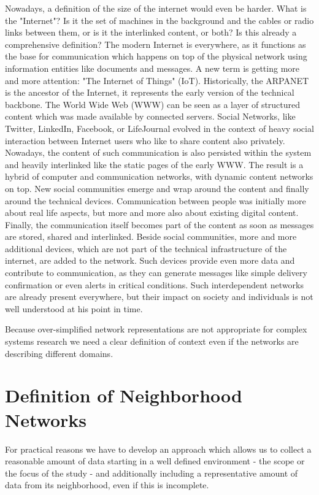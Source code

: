 \documentclass[a4paper,10pt]{scrbook}
\begin{document}
Nowadays, a definition of the size of the internet would even be harder. What is the "Internet"? Is it the set of machines in the background and the cables or radio links between them, or is it the interlinked content, or both? Is this already a comprehensive definition? The modern Internet is everywhere, as it functions as the base for communication which happens on top of the physical network using information entities like documents and messages. A new term is getting more and more attention: "The Internet of Things" (IoT). Historically, the ARPANET is the ancestor of the Internet, it represents the early version of the technical backbone. The World Wide Web (WWW) can be seen as a layer of structured content which was made available by connected servers. Social Networks, like Twitter, LinkedIn, Facebook, or LifeJournal evolved in the context of heavy social interaction between Internet users who like to share content also privately. Nowadays, the content of such communication is also persisted within the system and heavily interlinked like the static pages of the early WWW. The result is a hybrid of computer and communication networks, with dynamic content networks on top. New social communities emerge and wrap around the content and finally around the technical devices. Communication between people was initially more about real life aspects, but more and more also about existing digital content. Finally, the communication itself becomes part of the content as soon as messages are stored, shared and interlinked. Beside social communities, more and more additional devices, which are not part of the technical infrastructure of the internet, are added to the network. Such devices provide even more data and contribute to communication, as they can generate messages like simple delivery confirmation or even alerts in critical conditions. Such interdependent networks are already present everywhere, but their impact on society and individuals is not well understood at his point in time. 

Because over-simplified network representations are not appropriate for complex systems research we need a clear definition of context even if the networks are describing different domains.
 
\section{Definition of Neighborhood Networks}
\label{sec.contextgraph}
For practical reasons we have to develop an approach which allows us to collect a reasonable amount of data starting in a well defined environment - the scope or the focus of the study - and additionally including a representative amount of data from its neighborhood, even if this is incomplete. 
 
\end{document}
